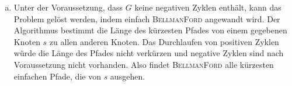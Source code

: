 \documentclass[a4paper]{scrartcl}
\begin{document}
\begin{enumerate}[(a)]
    \item
        Unter der Voraussetzung, dass $G$ keine negativen Zyklen enthält, kann
        das Problem gelöst werden, indem einfach \textsc{BellmanFord} angewandt
        wird.
        Der Algorithmus bestimmt die Länge des kürzesten Pfades von einem
        gegebenen Knoten $s$ zu allen anderen Knoten.
        Das Durchlaufen von positiven Zyklen würde die Länge des Pfades nicht
        verkürzen und negative Zyklen sind nach Voraussetzung nicht vorhanden.
        Also findet \textsc{BellmanFord} alle kürzesten einfachen Pfade, die von
        $s$ ausgehen.

\end{enumerate}
\end{document}
